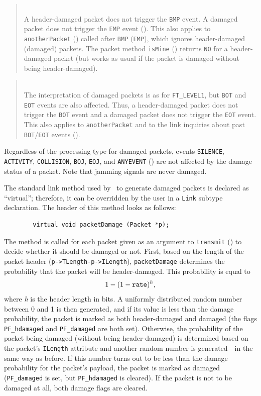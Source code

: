 \begin{quote}
\noindent{}\\ \hspace{0in}
A header-damaged packet does not trigger the {\tt BMP} event.
A damaged packet does not trigger the {\tt EMP} event ().
This also applies to {\tt anotherPacket} ()
called after {\tt BMP} ({\tt EMP}),
which ignores header-damaged (damaged) packets.
The packet method {\tt isMine} () returns {\tt NO} for
a header-damaged packet (but works as usual if the packet is damaged without
being header-damaged).
\end{quote}

\begin{quote}
\noindent{}\\ \hspace{0in}
The interpretation of damaged packets is as for {\tt FT\_LEVEL1}, but
{\tt BOT} and {\tt EOT} events are also affected.
Thus, a header-damaged packet does not trigger the {\tt BOT} event and
a damaged packet does not trigger the {\tt EOT} event.
This also applies to {\tt anotherPacket} and to the link inquiries about past
{\tt BOT}/{\tt EOT} events ().
\end{quote}\medskip

Regardless of the processing type for damaged packets, events {\tt SILENCE},
{\tt ACTIVITY}, {\tt COLLISION}, {\tt BOJ}, {\tt EOJ}, and {\tt ANYEVENT}
() are not affected by the damage status of a packet.
Note that jamming signals are never damaged.

The standard link
method used by \smurph\ to generate damaged packets is declared
as ``virtual''; therefore, it can be overridden by the user in a {\tt Link}
subtype declaration.
The header of this method looks as follows:
\begin{verbatim}
        virtual void packetDamage (Packet *p);
\end{verbatim}
The method is called for each packet given as an argument to {\tt transmit}
() to decide whether it should be damaged or not.
First,
based on the length of the packet header ({\tt p->TLength-p->ILength}),
{\tt packetDamage} determines the probability that the packet will
be header-damaged.
This probability is equal to
\[
1-(1-{\tt rate})^{h},
\]
where {\em h\/} is the header length in bits.
A uniformly distributed random number between 0 and 1 is then generated,
and if its value is less than the damage probability, the packet is
marked as both header-damaged and damaged (the flags
{\tt PF\_hdamaged} and {\tt PF\_damaged} are both set).
Otherwise, the probability of the packet being damaged (without being
header-damaged) is determined based on the packet's {\tt ILength} attribute
and another random number is generated---in the same way as before.
If this number turns out to be less than the damage probability for the
packet's payload, the packet is marked as damaged ({\tt PF\_damaged} is set,
but {\tt PF\_hdamaged} is cleared).
If the packet is not to be damaged at all, both damage flags are cleared.

